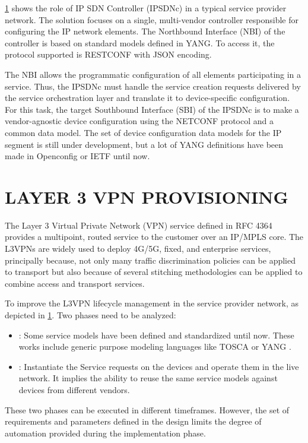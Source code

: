 \documentclass[conference]{IEEEtran}
\begin{document}
\ref{} shows the role of IP SDN Controller (IPSDNc) in a typical service provider network. The solution focuses on a single, multi-vendor controller responsible for configuring the IP network elements. The Northbound Interface (NBI) of the controller is based on standard models defined in YANG. To access it, the protocol supported is RESTCONF with JSON encoding.

The NBI allows the programmatic configuration of all elements participating in a service. Thus, the IPSDNc must handle the service creation requests delivered by the service orchestration layer and translate it to device-specific configuration. For this task, the target Southbound Interface (SBI) of the IPSDNc is to make a vendor-agnostic device configuration using the NETCONF protocol and a common data model. The set of device configuration data models for the IP segment is still under development, but a lot of YANG definitions have been made in Openconfig or IETF until now. 

\section{LAYER 3 VPN PROVISIONING}

The Layer 3 Virtual Private Network (VPN) service defined in RFC 4364 \cite{} provides a multipoint, routed service to the customer over an IP/MPLS core. The L3VPNs are widely used to deploy 4G/5G, fixed, and enterprise services, principally because, not only many traffic discrimination policies can be applied to transport but also because of several stitching methodologies can be applied to combine access and transport services. 

To improve the L3VPN lifecycle management in the service provider network, as depicted in \ref{}. Two phases need to be analyzed:
\begin{itemize}
    \item {}: Some service models have been defined and standardized until now. These works include generic purpose modeling languages like TOSCA or YANG \cite{}.
    \item {}: Instantiate the Service requests on the devices and operate them in the live network. It implies the ability to reuse the same service models against devices from different vendors.
\end{itemize}

These two phases can be executed in different timeframes. However, the set of requirements and parameters defined in the design limits the degree of automation provided during the implementation phase. 
\end{document}
